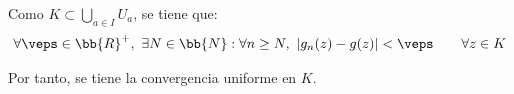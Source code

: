 \documentclass[12pt]{article}
\begin{document}
\begin{ejercicio}
\begin{description}
            Como $K\subset \bigcup\limits_{a\in I} U_a$, se tiene que:
            \begin{align*}
                \forall \veps\in \bb{R}^+,\ \exists N\in \bb{N} : \forall n\geq N,\ |g_n(z)-g(z)|<\veps\qquad \forall z\in K
            \end{align*}

            Por tanto, se tiene la convergencia uniforme en $K$.
        \end{description}
    \end{ejercicio}
\end{document}
